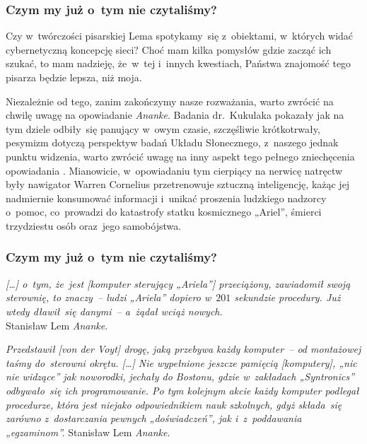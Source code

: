 \documentclass[10pt,t]{beamer}
\begin{document}
\begin{frame}
  \frametitle{Czym my już o~tym nie czytaliśmy?}


  Czy w~twórczości pisarskiej Lema spotykamy~się z~obiektami, w~których
  widać cybernetyczną koncepcję sieci? Choć mam kilka pomysłów gdzie zacząć
  ich szukać, to mam nadzieję, że~w~tej i~innych kwestiach, Państwa
  znajomość tego pisarza będzie lepsza, niż moja.

  Niezależnie od tego, zanim zakończymy nasze rozważania, warto zwrócić na
  chwilę uwagę na opowiadanie \textit{Ananke}. Badania dr.~Kukulaka
  pokazały jak na tym dziele odbiły~się panujący w~owym czasie, szczęśliwie
  krótkotrwały, pesymizm dotyczą perspektyw badań Układu Słonecznego,
  z~naszego jednak punktu widzenia, warto zwrócić uwagę na inny aspekt tego
  pełnego zniechęcenia opowiadania
  \parencite{Kukulak-Two-Faces-of-Mars-Pub-2023}. Mianowicie, w~opowiadaniu
  tym cierpiący na nerwicę natręctw były nawigator Warren Cornelius
  przetrenowuje sztuczną inteligencję, każąc jej
  nadmiernie konsumować informacji i~unikać proszenia ludzkiego nadzorcy
  o~pomoc, co~prowadzi do katastrofy statku kosmicznego „Ariel”, śmierci
  trzydziestu osób oraz~jego samobójstwa.

\end{frame}





\begin{frame}
  \frametitle{Czym my już o~tym nie czytaliśmy?}


  \textit{[\ldots] o~tym, że~jest [komputer sterujący „Ariela”] przeciążony,
    zawiadomił swoją sterownię, to znaczy~-- ludzi „Ariela” dopiero w~$201$
    sekundzie procedury. Już wtedy dławił~się danymi~-- a~żądał wciąż
    nowych.} \\
  Stanisław Lem \textit{Ananke}.

  \textit{Przedstawił [von der Voyt] drogę, jaką przebywa każdy komputer~--
    od montażowej taśmy do~sterowni okrętu. [\ldots] Nie wypełnione jeszcze
    pamięcią [komputery], „nic nie widzące” jak noworodki, jechały do
    Bostonu, gdzie w~zakładach „Syntronics” odbywało~się ich programowanie.
    Po tym kolejnym akcie każdy komputer podlegał procedurze, która jest
    niejako odpowiednikiem nauk szkolnych, gdyż składa~się zarówno
    z~dostarczania pewnych „doświadczeń”, jak i~z~poddawania „egzaminom”.}
  Stanisław Lem \textit{Ananke}.

\end{frame}
\end{document}

